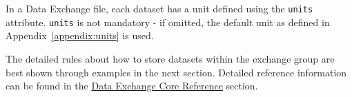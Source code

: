 In a  Data Exchange file, each dataset has a unit defined using the
{\tt units} attribute. {\tt units}  is not mandatory - if omitted, the default
unit as defined in Appendix~\ref{appendix:units} is used.

The detailed rules about how to store datasets within the exchange group
are best shown through examples in the next section. Detailed reference information
can be found in the \hyperref[sec:corereference]{Data Exchange Core Reference} section.

